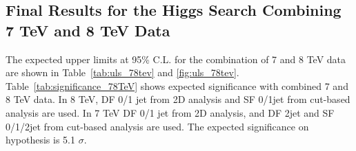 \clearpage 

\subsection{Final Results for the Higgs Search Combining 7 TeV and 8 TeV Data}
\label{sec:search_results_finalcomb}


The expected upper limits at 95\% C.L. for the combination of 7 and 8 TeV data 
are shown in Table~\ref{tab:uls_78tev} and \ref{fig:uls_78tev}. 
Table~\ref{tab:significance_78TeV} shows expected significance with combined 7 and 8 TeV data. 
In 8 TeV, DF 0/1 jet from 2D analysis and SF 0/1jet from cut-based analysis are used.
In 7 TeV DF 0/1 jet from 2D analysis, and DF 2jet and SF 0/1/2jet from cut-based analysis are used.
The expected significance on \GeV hypothesis is 5.1 $\sigma$.

